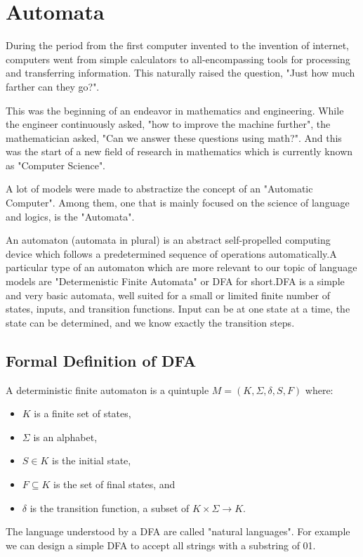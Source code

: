 % 

\section{Automata}
During the period from the first computer invented to the invention of internet, computers went from simple calculators to all-encompassing tools for processing and transferring information. This naturally raised the question, "Just how much farther can they go?".

This was the beginning of an endeavor in mathematics and engineering. While the engineer continuously asked, "how to improve the machine further", the mathematician asked, "Can we answer these questions using math?". And this was the start of a new field of research in mathematics which is currently known as "Computer Science".

A lot of models were made to abstractize the concept of an "Automatic Computer". Among them, one that is mainly focused on the science of language and logics, is the "Automata".

An automaton (automata in plural) is an abstract self-propelled computing device which follows a predetermined sequence of operations automatically.A particular type of an automaton which are more relevant to our topic of language models are "Determenistic Finite Automata" or DFA for short.DFA is a simple and very basic automata, well suited for a small or limited finite number of states, inputs, and transition functions. Input can be at one state at a time, the state can be determined, and we know exactly the transition steps.

\subsection{Formal Definition of DFA}

A deterministic finite automaton is a quintuple \( M = (K, \Sigma, \delta, S, F) \) where:

\begin{itemize}
    \item \( K \) is a finite set of states,
    \item \( \Sigma \) is an alphabet,
    \item \( S \in K \) is the initial state,
    \item \( F \subseteq K \) is the set of final states, and
    \item \( \delta \) is the transition function, a subset of \( K \times \Sigma \rightarrow K \).
\end{itemize}

The language understood by a DFA are called "natural languages". For example we can design a simple DFA to accept all strings with a substring of 01.


